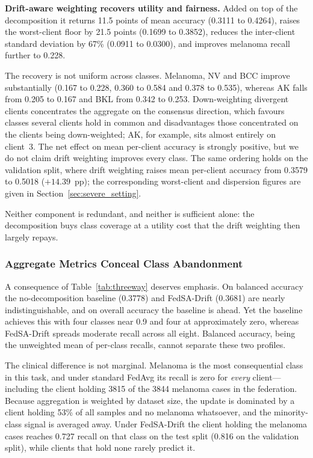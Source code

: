 \documentclass{ieeeaccess}
\newcommand{\sadrift}{FedSA-Drift}
\begin{document}
\textbf{Drift-aware weighting recovers utility and fairness.} Added on top of the decomposition it returns 11.5 points of mean accuracy (0.3111 to 0.4264), raises the worst-client floor by 21.5 points (0.1699 to 0.3852), reduces the inter-client standard deviation by 67\% (0.0911 to 0.0300), and improves melanoma recall further to 0.228.

The recovery is not uniform across classes. Melanoma, NV and BCC improve substantially (0.167 to 0.228, 0.360 to 0.584 and 0.378 to 0.535), whereas AK falls from 0.205 to 0.167 and BKL from 0.342 to 0.253. Down-weighting divergent clients concentrates the aggregate on the consensus direction, which favours classes several clients hold in common and disadvantages those concentrated on the clients being down-weighted; AK, for example, sits almost entirely on client~3. The net effect on mean per-client accuracy is strongly positive, but we do not claim drift weighting improves every class. The same ordering holds on the validation split, where drift weighting raises mean per-client accuracy from 0.3579 to 0.5018 ($+14.39$~pp); the corresponding worst-client and dispersion figures are given in Section~\ref{sec:severe_setting}.

Neither component is redundant, and neither is sufficient alone: the decomposition buys class coverage at a utility cost that the drift weighting then largely repays.

\subsubsection{Aggregate Metrics Conceal Class Abandonment}

A consequence of Table~\ref{tab:threeway} deserves emphasis. On balanced accuracy the no-decomposition baseline (0.3778) and \sadrift{} (0.3681) are nearly indistinguishable, and on overall accuracy the baseline is ahead. Yet the baseline achieves this with four classes near 0.9 and four at approximately zero, whereas \sadrift{} spreads moderate recall across all eight. Balanced accuracy, being the unweighted mean of per-class recalls, cannot separate these two profiles.

The clinical difference is not marginal. Melanoma is the most consequential class in this task, and under standard FedAvg its recall is zero for \emph{every} client---including the client holding 3815 of the 3844 melanoma cases in the federation. Because aggregation is weighted by dataset size, the update is dominated by a client holding 53\% of all samples and no melanoma whatsoever, and the minority-class signal is averaged away. Under \sadrift{} the client holding the melanoma cases reaches 0.727 recall on that class on the test split (0.816 on the validation split), while clients that hold none rarely predict it.
\end{document}
